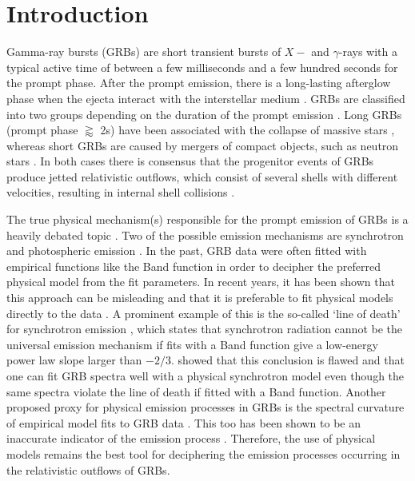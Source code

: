 \documentclass{aa}
\begin{document}

\maketitle

\section{Introduction}

Gamma-ray bursts (GRBs) are short transient bursts of $X-$ and $\gamma$-rays \citep{Klebesadel+1973} with a typical active time of between a few milliseconds and a few hundred seconds for the prompt phase.
After the prompt emission, there is a long-lasting afterglow phase when the ejecta interact with the interstellar medium \citep{MeszarosRees1997, afterglow}. GRBs are classified into two groups depending on the duration of the prompt emission \citep{shortlong}. Long GRBs (prompt phase $\gtrapprox$ 2s) have been associated with the collapse of massive stars \citep{SN1, Hjorth+2003, SN2}, whereas short GRBs are  caused by mergers of compact objects, such as neutron stars \citep{Eichler+1989, gw}. In both cases there is consensus that the progenitor events of GRBs produce jetted relativistic outflows, which consist of several shells with different velocities, resulting in internal shell collisions \citep{ReesMeszaros1994, Mochkovitch+1995}.

The true physical mechanism(s) responsible for the prompt emission of GRBs is a heavily debated topic \citep[for a review, see][]{KumarZhang2015}.
Two of the possible emission mechanisms are synchrotron \citep[e.g.][]{syn_shell, bosnjak_syn, synch} and photospheric emission \citep[e.g.][]{Goodman1986, photo_1, photo_2, photo_3}. In the past, GRB data were often fitted with empirical functions like the Band function \citep{band} in order to decipher the preferred physical model from the fit parameters. In recent years, it has been shown that this approach can be misleading and that it is preferable to fit physical models directly to the data \citep{Burgess-2014, physical_models, synch}. A prominent example of this is the so-called `line of death' for synchrotron emission \citep{line-of-death, line-of-death2}, which states that synchrotron radiation cannot be the universal emission mechanism if fits with a Band function give a low-energy power law slope larger than $-2/3$. \citet{synch} showed that this conclusion is flawed and that one can fit GRB spectra well with a physical synchrotron model even though the same spectra violate the line of death if fitted with a Band function. Another proposed proxy for physical emission processes in GRBs is the spectral curvature of empirical model fits to GRB data \citep{Yu-2015, Axelsson-2015}. This too has been shown to be an inaccurate indicator of the emission process \citep{Burgess2019}. Therefore, the use of physical models remains the best tool for deciphering the emission processes occurring in the relativistic outflows of GRBs.
\end{document}
